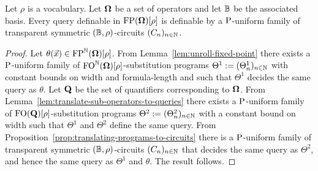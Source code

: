 \documentclass[../main/thesis.tex]{subfiles}
\begin{document}
\begin{thm}
  Let $\rho$ is a vocabulary. Let $\mathbf{\mathbf{\Omega}}$ be a set of operators and let $\mathbb{B}$
  be the associated basis. Every query definable in $\text{\upshape FP}(\mathbf{\mathbf{\Omega}})[\rho]$ is
  definable by a $\mathrm{P}$-uniform family of transparent symmetric $(\mathbb{B},
  \rho)$-circuits $(C_n)_{n \in \mathbb{N}}$.
  \label{thm:translating-FP-formulas-to-circuits}
\end{thm}
\begin{proof}
  Let $\theta(\vec{x}) \in \text{\upshape FP}^{\mathbb{N}}(\mathbf{\mathbf{\Omega}})[\rho]$. From
  Lemma~\ref{lem:unroll-fixed-point} there exists a $\mathrm{P}$-uniform family of
  $\text{\upshape FO}^{\mathbb{N}}(\mathbf{\mathbf{\Omega}})[\rho]$-substitution programs $\Theta^1 := (\Theta^1_n)_{n
    \in \mathbb{N}}$ with constant bounds on width and formula-length and such that
  $\Theta^1$ decides the same query as $\theta$. Let $\mathbf{Q}$ be the set of
  quantifiers corresponding to $\mathbf{\mathbf{\Omega}}$. From
  Lemma~\ref{lem:translate-sub-operators-to-queries} there exists a
  $\mathrm{P}$-uniform family of $\text{\upshape FO}(\mathbf{Q})[\rho]$-substitution programs $\Theta^2
  := (\Theta^2_n)_{n \in \mathbb{N}}$ with a constant bound on width such that
  $\Theta^1$ and $\Theta^2$ define the same query. From
  Proposition~\ref{prop:translating-programs-to-circuits} there is a
  $\mathrm{P}$-uniform family of transparent symmetric $(\mathbb{B}, \rho)$-circuits $(C_n)_{n
    \in \mathbb{N}}$ that decides the same query as $\Theta^2$, and hence the same
  query as $\Theta^1$ and $\theta$. The result follows.
\end{proof}
\end{document}
